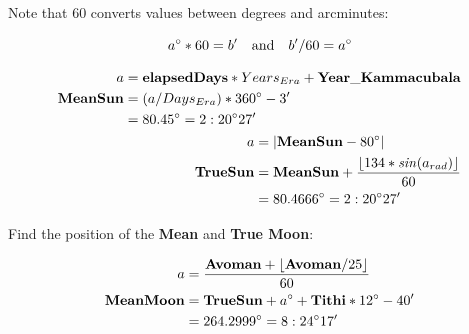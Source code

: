 \documentclass[11pt,oneside]{memoir-article}
\begin{document}
Note that 60 converts values between degrees and arcminutes: 

\[ a^\circ*60=b^\prime \quad \text{and} \quad b^\prime/60 = a^\circ \]

\clearpage

\cheatsheetPar

\begin{align}
\begin{split}
                      a &= \mathbf{elapsedDays} * Years_{Era} + \mathbf{Year\_Kammacubala}\\
       \mathbf{MeanSun} &= (a / Days_{Era}) * 360^\circ - 3^\prime\\
                        &= 80.45^\circ = 2:20^\circ 27^\prime
\end{split}\\
\begin{split}
                         a &= | \mathbf{MeanSun} - 80^\circ | \\
          \mathbf{TrueSun} &= \mathbf{MeanSun} + \frac{\lfloor 134 * \mathit{sin}(a_{rad}) \rfloor}{60}\\
                           &= 80.4666^\circ = 2:20^\circ 27^\prime
\end{split}
\end{align}

Find the position of the \textbf{Mean} and \textbf{True Moon}:

\savenotes


\spewnotes

\begin{align}
\begin{split}
                  a &= \frac{\mathbf{Avoman} + \lfloor \mathbf{Avoman} / 25 \rfloor}{60}\\
  \mathbf{MeanMoon} &= \mathbf{TrueSun} + a^\circ + \mathbf{Tithi} * 12^\circ - 40^\prime\\
                    &= 264.2999^\circ = 8:24^\circ 17^\prime
\end{split}
\end{align}
\end{document}
